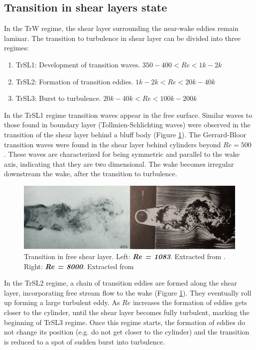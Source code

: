 \documentclass[journal]{new-aiaa}
\begin{document}
\subsection{Transition in shear layers state}

In the TrW regime, the shear layer surrounding the near-wake eddies remain laminar. The transition to turbulence in shear layer can be divided into three regimes:

\begin{enumerate}[label=(\roman*)]
\item TrSL1: Development of transition waves. $350-400<Re<1k-2k$
\item TrSL2: Formation of transition eddies. $1k-2k<Re<20k-40k$
\item TrSL3: Burst to turbulence. $20k-40k<Re<100k-200k$
\end{enumerate}

In the TrSL1 regime transition waves appear in the free surface. Similar waves to those found in boundary layer (Tollmien-Schlichting waves) were observed in the transition of the shear layer behind a bluff body (Figure \ref{fig:TrSL}). The Gerrard-Bloor transition waves were found in the shear layer behind cylinders beyond $Re=500$ \cite{Gerrard1978}. These waves are characterized for being symmetric and parallel to the wake axis, indicating that they are two dimensional. The wake becomes irregular downstream the wake, after the transition to turbulence.

\begin{figure}[H]
\begin{center}
\includegraphics[width=1\textwidth]{Images/federico/Figure05}
\caption{Transition in free shear layer. Left: \textbf{\textit{Re = 1083}}. Extracted from \cite{Gerrard1978}. Right: \textbf{\textit{Re = 8000}}. Extracted from \cite{Zdravkovich1997}}
\label{fig:TrSL}
\end{center}
\end{figure}

In the TrSL2 regime, a chain of transition eddies are formed along the shear layer, incorporating free stream flow to the wake (Figure \ref{fig:TrSL}). They eventually roll up forming a large turbulent eddy.  As $Re$ increases the formation of eddies  gets closer to the cylinder, until the shear layer becomes fully turbulent, marking the beginning of TrSL3 regime. Once this regime starts, the formation of eddies do not change its position (e.g. do not get closer to the cylinder) and the transition is reduced to a spot of sudden burst into turbulence.
\end{document}

